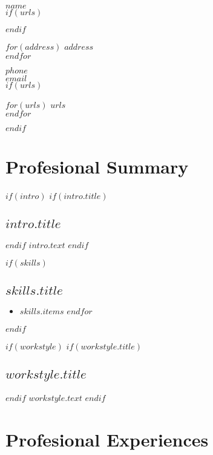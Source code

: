 \documentclass[$fontsize$, a4paper]{article}
\begin{document}
{\LARGE $name$}\\[.2cm]

$if(urls)$
\begin{multicols}{2}
$endif$

$for(address)$
$address$\\
$endfor$

\vspace{-10pt}

$phone$\\
\href{mailto:$email$}{$email$}\\


$if(urls)$
\columnbreak

$for(urls)$
\href{http://$urls$}{$urls$}\\
$endfor$
\end{multicols}
$endif$

\vspace{23pt}

\section*{Profesional Summary}
\noindent

$if(intro)$
$if(intro.title)$
\subsection*{$intro.title$}
$endif$
$intro.text$
$endif$

$if(skills)$
\subsection*{$skills.title$}
\begin{itemize}
  \setlength{\itemsep}{1pt}
    $for(skills.items)$
      \item $skills.items$
    $endfor$
\end{itemize}
$endif$

$if(workstyle)$
$if(workstyle.title)$
\subsection*{$workstyle.title$}
$endif$
$workstyle.text$
$endif$


\vspace{21pt}

\section*{Profesional Experiences}
\noindent
\end{document}
